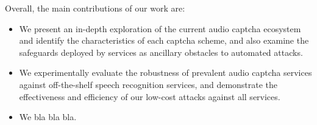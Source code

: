 Overall, the main contributions of our work are:

\begin{itemize}

\item We present an in-depth exploration of the current audio captcha ecosystem and identify the characteristics 
of each captcha scheme, and also examine the safeguards deployed by services as ancillary obstacles to automated
attacks.

\item We experimentally evaluate the robustness of prevalent audio captcha services against
off-the-shelf speech recognition services, and demonstrate the effectiveness and efficiency 
of our low-cost attacks against all services.

\item We bla bla bla.

\end{itemize}
